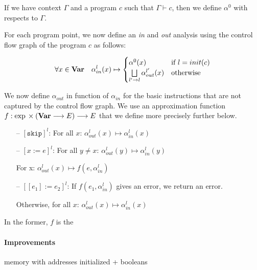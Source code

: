 If we have context $\Gamma$ and a program $c$ such that $\Gamma \vdash c$, then we define $\alpha^0$ with respects to $\Gamma$.

For each program point, we now define an \emph{in} and \emph{out} analysis using the control flow graph of the program $c$ as follows:

\[
\forall x \in \mathbf{Var}{} \quad \alpha_{in}^l(x) \mapsto
	\begin{cases}
		\alpha^0(x) & \text{if $l = init(c)$} \\
		\bigsqcup\limits_{l' \rightarrow l} \alpha_{out}^{l'}(x) & \text{otherwise} \\
	\end{cases}
\]

We now define $\alpha_{out}$ in function of $\alpha_{in}$ for the basic instructions that are not captured by the control flow graph.
We use an approximation function $f: \exp{} \times (\mathbf{Var}{} \longrightarrow E) \longrightarrow E$ that we define more precisely further below.

\begin{itemize}
	\itemsep0em
	\item[--] $\left[\texttt{skip}\right]^l$: For all $x$: $\alpha_{out}^l(x) \mapsto \alpha_{in}^l(x)$
	\item[--] $\left[x := e\right]^l$: For all $y \neq x$: $\alpha_{out}^l(y) \mapsto \alpha_{in}^l(y)$
	
	For x: $\alpha_{out}^l(x) \mapsto f(e, \alpha_{in}^l)$
	\item[--] $\left[[e_1] := e_2\right]^l$: If $f(e_1, \alpha_{in}^l)$ gives an error, we return an error.
	
	Otherwise, for all $x$: $\alpha_{out}^l(x) \mapsto \alpha_{in}^l(x)$
\end{itemize}

In the former, $f$ is the 
 

\paragraph{Improvements} memory with addresses initialized + booleans